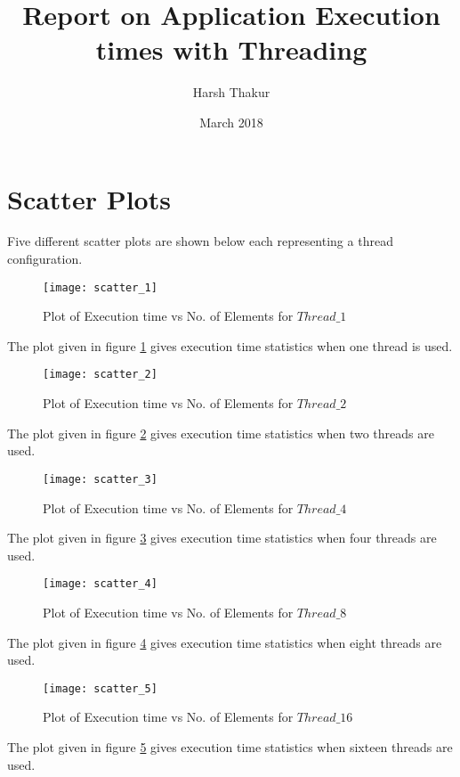 \documentclass{article}
\title{Report on Application Execution times with Threading}
\author{Harsh Thakur}
\date{March 2018}
\begin{document}
\maketitle

\section{Scatter Plots}
Five different scatter plots are shown below each representing a thread configuration.
\begin{figure}[h]
    \centering
    \texttt{[image: scatter\_1]}
    \caption{Plot of Execution time vs No. of Elements for $Thread\_1$ }
    \label{fig:Thread_1}
\end{figure}

The plot given in figure \ref{fig:Thread_1} gives execution time statistics when one thread is used.

\begin{figure}[h]
    \centering
    \texttt{[image: scatter\_2]}
    \caption{Plot of Execution time vs No. of Elements for $Thread\_2$ }
    \label{fig:Thread_2}
\end{figure}

The plot given in figure \ref{fig:Thread_2} gives execution time statistics when two threads are used.

\begin{figure}[h]
    \centering
    \texttt{[image: scatter\_3]}
    \caption{Plot of Execution time vs No. of Elements for $Thread\_4$ }
    \label{fig:Thread_4}
\end{figure}

The plot given in figure \ref{fig:Thread_4} gives execution time statistics when four threads are used.

\begin{figure}[h]
    \centering
    \texttt{[image: scatter\_4]}
    \caption{Plot of Execution time vs No. of Elements for $Thread\_8$ }
    \label{fig:Thread_8}
\end{figure}

The plot given in figure \ref{fig:Thread_8} gives execution time statistics when eight threads are used.

\begin{figure}[h]
    \centering
    \texttt{[image: scatter\_5]}
    \caption{Plot of Execution time vs No. of Elements for $Thread\_16$ }
    \label{fig:Thread_16}
\end{figure}

The plot given in figure \ref{fig:Thread_16} gives execution time statistics when sixteen threads are used.
\end{document}
